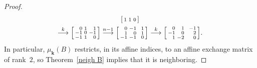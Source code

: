 \documentclass[10pt]{article}
\theoremstyle{definition}
\theoremstyle{remark}
\numberwithin{equation}{section}
\newcommand{\0}{{\mathbf{0}}}
\newcommand{\kk}{{\boldsymbol{k}}}
\begin{document}
\begin{proof}
\begin{multline*}
\begin{bsmallmatrix*}[r]
1&1&0
\end{bsmallmatrix*}\\
\overset{k}{\longrightarrow}
\begin{bsmallmatrix*}[r]
0&1&\,\,\,1\\
-1&0&-1\\
-1&1&0
\end{bsmallmatrix*}
\overset{n-1}{\longrightarrow}
\begin{bsmallmatrix*}[r]
0&-1&\,\,\,1\\
1&0&1\\
-1&-1&0
\end{bsmallmatrix*}
\overset{k}{\longrightarrow}
\begin{bsmallmatrix*}[r]
0&1&\,\,\,-1\\
-1&0&2\\
1&-2&0
\end{bsmallmatrix*}.
\end{multline*}
In particular, $\mu_\kk(B)$ restricts, in its affine indices, to an affine exchange matrix of rank~$2$,
so Theorem~\ref{neigh B} implies that it is neighboring.


\end{proof}
\end{document}
